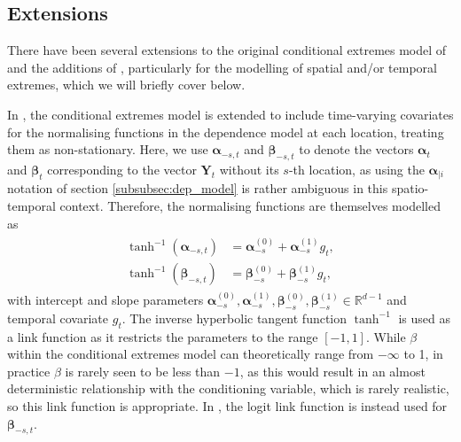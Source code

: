 \documentclass{article}
\numberwithin{equation}{section}
\begin{document}
\subsection{Extensions} \label{subsec:extensions}

There have been several extensions to the original conditional extremes model of \cite{Heffernan2004} and the additions of \cite{Keef2013}, particularly for the modelling of spatial and/or temporal extremes, which we will briefly cover below. 

In \cite{Winter2016}, the conditional extremes model is extended to include time-varying covariates for the normalising functions in the dependence model at each location, treating them as non-stationary.
Here, we use $\bm{\alpha}_{-s, t}$ and $\bm{\beta}_{-s, t}$ to denote the vectors $\bm{\alpha}_t$ and $\bm{\beta}_t$ corresponding to the vector $\bm{Y}_t$ without its $s$-th location, as using the $\bm{\alpha}_{\mid i}$ notation of section \ref{subsubsec:dep_model}
is rather ambiguous in this spatio-temporal context. 
Therefore, the normalising functions are themselves modelled as
\begin{align} \label{eq:ce_winter}
  \begin{split}
  \tanh^{-1}(\bm{\alpha}_{-s, t}) &= \bm{\alpha}^{(0)}_{-s} + \bm{\alpha}^{(1)}_{-s}g_t, \\
  \tanh^{-1}(\bm{\beta}_{-s, t}) &= \bm{\beta}^{(0)}_{-s} + \bm{\beta}^{(1)}_{-s}g_t,
  \end{split}
\end{align}
with intercept and slope parameters $\bm{\alpha}^{(0)}_{-s}, \bm{\alpha}^{(1)}_{-s}, \bm{\beta}^{(0)}_{-s}, \bm{\beta}^{(1)}_{-s} \in \mathbb{R}^{d-1}$ and temporal covariate $g_t$.
The inverse hyperbolic tangent function $\tanh^{-1}$ is used as a link function as it restricts the parameters to the range $[-1, 1]$. 
While $\beta$ within the conditional extremes model can theoretically range from $-\infty$ to 1, in practice $\beta$ is rarely seen to be less than $-1$, as this would result in an almost deterministic relationship with the conditioning variable, which is rarely realistic, so this link function is appropriate. 
In \cite{Richards2023}, the logit link function is instead used for $\bm{\beta}_{-s, t}$. 
\end{document}
